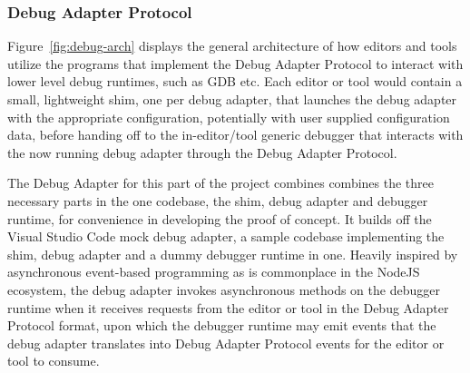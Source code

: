 \documentclass[12pt,pdftex,titlepage]{report}
\begin{document}
                \subsubsection{Debug Adapter Protocol}
                    Figure~\ref{fig:debug-arch} displays the general architecture of how editors and tools utilize the programs that implement the Debug Adapter Protocol to interact with
                    lower level debug runtimes, such as GDB etc. Each editor or tool would contain a small, lightweight shim, one per debug adapter, that launches the debug adapter with the
                    appropriate configuration, potentially with user supplied configuration data, before handing off to the in-editor/tool generic debugger that interacts with the now running
                    debug adapter through the Debug Adapter Protocol.

                    The Debug Adapter for this part of the project combines combines the three necessary parts in the one codebase, the shim, debug adapter and debugger runtime, for convenience
                    in developing the proof of concept. It builds off the Visual Studio Code mock debug adapter, a sample codebase implementing the shim, debug adapter and a dummy debugger
                    runtime in one. Heavily inspired by asynchronous event-based programming as is commonplace in the NodeJS ecosystem, the debug adapter invokes asynchronous methods on the 
                    debugger runtime when it receives requests from the editor or tool in the Debug Adapter Protocol format, upon which the debugger runtime may emit events that the debug adapter
                    translates into Debug Adapter Protocol events for the editor or tool to consume.
\end{document}
